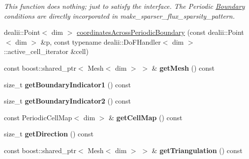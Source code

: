\begin{DoxyCompactItemize}
\begin{DoxyCompactList}\small\item\em This function does nothing; just to satisfy the interface. The Periodic \hyperlink{classnatrium_1_1Boundary}{Boundary} conditions are directly incorporated in make\_\-sparser\_\-flux\_\-sparsity\_\-pattern. \item\end{DoxyCompactList}\item 
dealii::Point$<$ dim $>$ \hyperlink{classnatrium_1_1PeriodicBoundary_a9a5677bbc1d59499ceec15a7893b8688}{coordinatesAcrossPeriodicBoundary} (const dealii::Point$<$ dim $>$ \&p, const typename dealii::DoFHandler$<$ dim $>$::active\_\-cell\_\-iterator \&cell)
\item 
\hypertarget{classnatrium_1_1PeriodicBoundary_a1351b925b9ae2008539a351a4baac3e0}{
const boost::shared\_\-ptr$<$ Mesh$<$ dim $>$ $>$ \& {\bfseries getMesh} () const }
\label{classnatrium_1_1PeriodicBoundary_a1351b925b9ae2008539a351a4baac3e0}

\item 
\hypertarget{classnatrium_1_1PeriodicBoundary_aead325214d43693a03a5d24613f4fe14}{
size\_\-t {\bfseries getBoundaryIndicator1} () const }
\label{classnatrium_1_1PeriodicBoundary_aead325214d43693a03a5d24613f4fe14}

\item 
\hypertarget{classnatrium_1_1PeriodicBoundary_af7e6f5b6028b0499df8335377156bc26}{
size\_\-t {\bfseries getBoundaryIndicator2} () const }
\label{classnatrium_1_1PeriodicBoundary_af7e6f5b6028b0499df8335377156bc26}

\item 
\hypertarget{classnatrium_1_1PeriodicBoundary_a4200caafcbda9553552220303e26bad0}{
const PeriodicCellMap$<$ dim $>$ \& {\bfseries getCellMap} () const }
\label{classnatrium_1_1PeriodicBoundary_a4200caafcbda9553552220303e26bad0}

\item 
\hypertarget{classnatrium_1_1PeriodicBoundary_a49e51f3612f67060f6189c3f92f64025}{
size\_\-t {\bfseries getDirection} () const }
\label{classnatrium_1_1PeriodicBoundary_a49e51f3612f67060f6189c3f92f64025}

\item 
\hypertarget{classnatrium_1_1PeriodicBoundary_ac02d8bae511dcb9d63d5da8478f2cb03}{
const boost::shared\_\-ptr$<$ Mesh$<$ dim $>$ $>$ \& {\bfseries getTriangulation} () const }
\label{classnatrium_1_1PeriodicBoundary_ac02d8bae511dcb9d63d5da8478f2cb03}

\end{DoxyCompactItemize}

